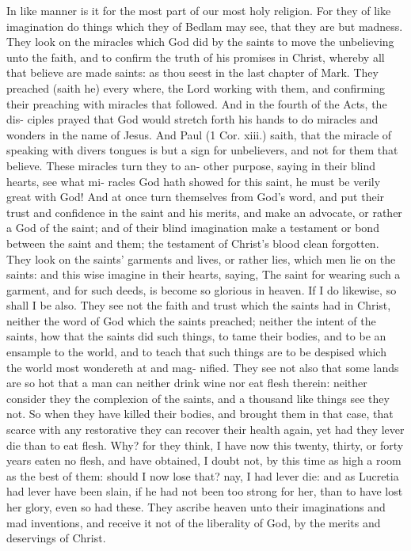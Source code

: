 \documentclass{custom}
\begin{document}
In like manner is it for the most part of our most holy 
religion. For they of like imagination do things which 
they of Bedlam may see, that they are but madness. 
They look on the miracles which God did by the saints to 
move the unbelieving unto the faith, and to confirm the 
truth of his promises in Christ, whereby all that believe 
are made saints: as thou seest in the last chapter of Mark. 
They preached (saith he) every where, the Lord working 
with them, and confirming their preaching with miracles 
that followed. And in the fourth of the Acts, the dis- 
ciples prayed that God would stretch forth his hands to 
do miracles and wonders in the name of Jesus. And 
Paul (1 Cor. xiii.) saith, that the miracle of speaking 
with divers tongues is but a sign for unbelievers, and not 
for them that believe. These miracles turn they to an- 
other purpose, saying in their blind hearts, see what mi- 
racles God hath showed for this saint, he must be verily 
great with God! And at once turn themselves from God's 
word, and put their trust and confidence in the saint and 
his merits, and make an advocate, or rather a God of the 
saint; and of their blind imagination make a testament or 
bond between the saint and them; the testament of Christ's 
blood clean forgotten. They look on the saints' garments 
and lives, or rather lies, which men lie on the saints:
and this wise imagine in their hearts, saying, The saint for
wearing such a garment, and for such deeds, is become 
so glorious in heaven. If I do likewise, so shall I be 
also. They see not the faith and trust which the saints had
in Christ, neither the word of God which the saints 
preached; neither the intent of the saints, how that the 
saints did such things, to tame their bodies, and to be an 
ensample to the world, and to teach that such things are 
to be despised which the world most wondereth at and mag- 
nified. They see not also that some lands are so hot 
that a man can neither drink wine nor eat flesh therein:
neither consider they the complexion of the saints, and a 
thousand like things see they not. So when they have 
killed their bodies, and brought them in that case, that 
scarce with any restorative they can recover their health
again, yet had they lever die than to eat flesh. Why?
for they think, I have now this twenty, thirty, or forty 
years eaten no flesh, and have obtained, I doubt not, by 
this time as high a room as the best of them: should 
I now lose that? nay, I had lever die: and as Lucretia 
had lever have been slain, if he had not been too strong for 
her, than to have lost her glory, even so had these. They 
ascribe heaven unto their imaginations and mad inventions,
and receive it not of the liberality of God, by the merits 
and deservings of Christ. 
\end{document}

